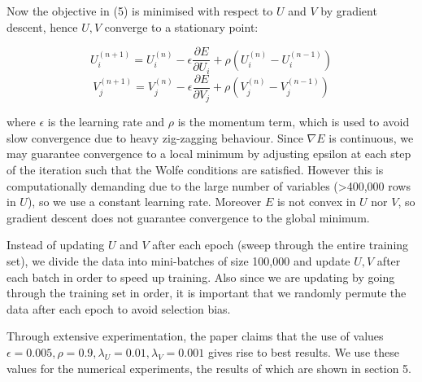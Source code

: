 \documentclass{article}
\theoremstyle{plain}
\begin{document}
Now the objective in (5) is minimised with respect to $U$ and $V$ by gradient descent, hence $U,V$ converge to a stationary point: 

\begin{equation}
U_i^{(n+1)}=U_i^{(n)}-\epsilon \frac{\partial E}{\partial U_i}+\rho(U_i^{(n)}-U_i^{(n-1)}) 
\end{equation}
\begin{equation}
V_j^{(n+1)}=V_j^{(n)}-\epsilon \frac{\partial E}{\partial V_j}+\rho(V_j^{(n)}-V_j^{(n-1)}) 
\end{equation}

where $\epsilon$ is the learning rate and $\rho$ is the momentum term, which is used to avoid slow convergence due to heavy zig-zagging behaviour. Since $\nabla E$ is continuous, we may guarantee convergence to a local minimum by adjusting epsilon at each step of the iteration such that the Wolfe conditions are satisfied. However this is computationally demanding due to the large number of variables (>400,000 rows in $U$), so we use a constant learning rate. Moreover $E$ is not convex in $U$ nor $V$, so gradient descent does not guarantee convergence to the global minimum.

Instead of updating $U$ and $V$ after each epoch (sweep through the entire training set), we divide the data into mini-batches of size 100,000 and update $U,V$ after each batch in order to speed up training. Also since we are updating by going through the training set in order, it is important that we randomly permute the data after each epoch to avoid selection bias.

Through extensive experimentation, the paper claims that the use of values $\epsilon=0.005, \rho=0.9, \lambda_U=0.01, \lambda_V=0.001$ gives rise to best results. We use these values for the numerical experiments, the results of which are shown in section 5.
\end{document}
